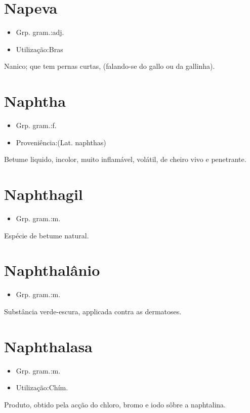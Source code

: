 \section{Napeva}
\begin{itemize}
\item {Grp. gram.:adj.}
\end{itemize}
\begin{itemize}
\item {Utilização:Bras}
\end{itemize}
Nanico; que tem pernas curtas, (falando-se do gallo ou da gallinha).
\section{Naphtha}
\begin{itemize}
\item {Grp. gram.:f.}
\end{itemize}
\begin{itemize}
\item {Proveniência:(Lat. \textunderscore naphthas\textunderscore )}
\end{itemize}
Betume liquido, incolor, muito inflamável, volátil, de cheiro vivo e penetrante.
\section{Naphthagil}
\begin{itemize}
\item {Grp. gram.:m.}
\end{itemize}
Espécie de betume natural.
\section{Naphthalânio}
\begin{itemize}
\item {Grp. gram.:m.}
\end{itemize}
Substância verde-escura, applicada contra as dermatoses.
\section{Naphthalasa}
\begin{itemize}
\item {Grp. gram.:m.}
\end{itemize}
\begin{itemize}
\item {Utilização:Chím.}
\end{itemize}
Produto, obtido pela acção do chloro, bromo e iodo sôbre a naphtalina.
